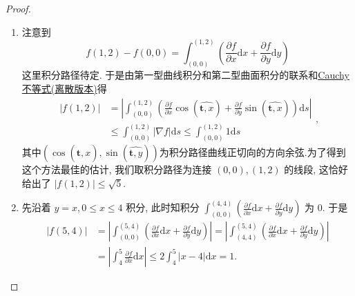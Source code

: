 \documentclass[../../main.tex]{subfiles}%
\begin{document}
\begin{proof}
\begin{enumerate}
\item 注意到
\[
f(1,2) - f(0,0) = \int_{(0,0)}^{(1,2)} \left( \frac{\partial f}{\partial x} \mathrm{d}x + \frac{\partial f}{\partial y} \mathrm{d}y \right)
\]
这里积分路径待定. 于是由第一型曲线积分和第二型曲面积分的联系和\hyperref[theorem:Cauchy不等式(离散版)]{Cauchy不等式(离散版本)}得
\[
\begin{aligned}
|f(1,2)| &= \left| \int_{(0,0)}^{(1,2)} \left( \frac{\partial f}{\partial x} \cos \left( \widehat{\boldsymbol{t},x} \right)  + \frac{\partial f}{\partial y} \sin \left( \widehat{\boldsymbol{t},x} \right)  \right) \mathrm{d}s \right| \\
&\leqslant \int_{(0,0)}^{(1,2)} |\nabla f| \mathrm{d}s \leqslant \int_{(0,0)}^{(1,2)} 1 \mathrm{d}s
\end{aligned},
\]
其中$\left( \cos \left( \widehat{\boldsymbol{t},x} \right) ,\sin \left( \widehat{\boldsymbol{t},y} \right) \right) $为积分路径曲线正切向的方向余弦.为了得到这个方法最佳的估计, 我们取积分路径为连接 \( (0,0),(1,2) \) 的线段, 这恰好给出了 \( |f(1,2)| \leqslant \sqrt{5} \).

\item 先沿着 \( y = x, 0 \leqslant x \leqslant 4 \) 积分, 此时知积分 \( \int_{(0,0)}^{(4,4)} \left( \frac{\partial f}{\partial x} \mathrm{d}x + \frac{\partial f}{\partial y} \mathrm{d}y \right) \) 为 0. 于是
\[
\begin{aligned}
|f(5,4)| &= \left| \int_{(0,0)}^{(5,4)} \left( \frac{\partial f}{\partial x} \mathrm{d}x + \frac{\partial f}{\partial y} \mathrm{d}y \right) \right| = \left| \int_{(4,4)}^{(5,4)} \left( \frac{\partial f}{\partial x} \mathrm{d}x + \frac{\partial f}{\partial y} \mathrm{d}y \right) \right| \\
&= \left| \int_{4}^{5} \frac{\partial f}{\partial x} \mathrm{d}x \right| \leqslant 2 \int_{4}^{5} |x - 4| \mathrm{d}x = 1.
\end{aligned}
\]
\end{enumerate}
\end{proof}
\end{document}
